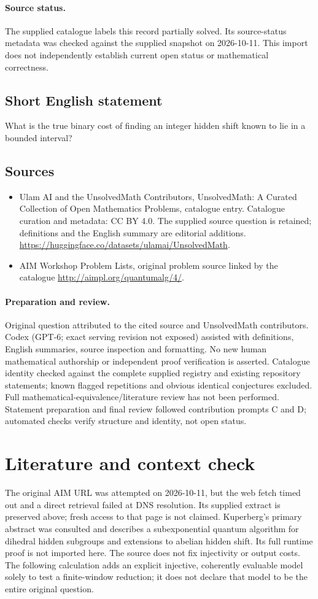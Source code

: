 \documentclass[11pt]{article}
\begin{document}
\paragraph{Source status.}
The supplied catalogue labels this record partially solved. Its source-status metadata was checked against the supplied snapshot on 2026-10-11. This import does not independently establish current open status or mathematical correctness.
\subsection{Short English statement}
What is the true binary cost of finding an integer hidden shift known to lie in a bounded interval?
\subsection{Sources}
\begin{itemize}
\item[S1] Ulam AI and the UnsolvedMath Contributors, UnsolvedMath: A Curated Collection of Open Mathematics Problems, catalogue entry. Catalogue curation and metadata: CC BY 4.0. The supplied source question is retained; definitions and the English summary are editorial additions.
\url{https://huggingface.co/datasets/ulamai/UnsolvedMath}.
\item[S2] AIM Workshop Problem Lists, original problem source linked by the catalogue
\url{http://aimpl.org/quantumalg/4/}.
\end{itemize}
\paragraph{Preparation and review.}
Original question attributed to the cited source and UnsolvedMath contributors. Codex (GPT-6; exact serving revision not exposed) assisted with definitions, English summaries, source inspection and formatting. No new human mathematical authorship or independent proof verification is asserted. Catalogue identity checked against the complete supplied registry and existing repository statements; known flagged repetitions and obvious identical conjectures excluded. Full mathematical-equivalence/literature review has not been performed. Statement preparation and final review followed contribution prompts C and D; automated checks verify structure and identity, not open status.
\label{end:statement}

\section{Literature and context check}
The original AIM URL was attempted on 2026-10-11, but the web fetch timed out and a direct retrieval failed at DNS resolution. Its supplied extract is preserved above; fresh access to that page is not claimed. Kuperberg's primary abstract was consulted and describes a subexponential quantum algorithm for dihedral hidden subgroups and extensions to abelian hidden shift. Its full runtime proof is not imported here. The source does not fix injectivity or output costs. The following calculation adds an explicit injective, coherently evaluable model solely to test a finite-window reduction; it does not declare that model to be the entire original question.
\end{document}
